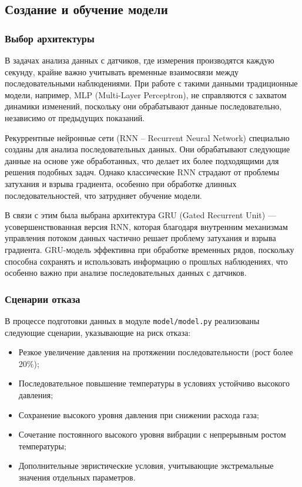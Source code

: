 \documentclass[a4paper,12pt]{article}
\begin{document}
\begin{flushleft}
    \subsection{Создание и обучение модели}

\subsubsection{Выбор архитектуры}

В задачах анализа данных с датчиков, где измерения производятся каждую секунду, крайне важно учитывать временные взаимосвязи между последовательными наблюдениями. При работе с такими данными традиционные модели, например, MLP (Multi-Layer Perceptron), не справляются с захватом динамики изменений, поскольку они обрабатывают данные последовательно, независимо от предыдущих показаний.

Рекуррентные нейронные сети (RNN – Recurrent Neural Network) специально созданы для анализа последовательных данных. Они обрабатывают следующие данные на основе уже обработанных, что делает их более подходящими для решения подобных задач. Однако классические RNN страдают от проблемы затухания и взрыва градиента, особенно при обработке длинных последовательностей, что затрудняет обучение модели.

В связи с этим была выбрана архитектура GRU (Gated Recurrent Unit) --- усовершенствованная версия RNN, которая благодаря внутренним механизмам управления потоком данных частично решает проблему затухания и взрыва градиента. GRU-модель эффективна при обработке временных рядов, поскольку способна сохранять и использовать информацию о прошлых наблюдениях, что особенно важно при анализе последовательных данных с датчиков.

\subsubsection{Сценарии отказа}

В процессе подготовки данных в модуле \texttt{model/model.py} реализованы следующие сценарии, указывающие на риск отказа:
\begin{itemize}
    \item Резкое увеличение давления на протяжении последовательности (рост более 20\%);
    \item Последовательное повышение температуры в условиях устойчиво высокого давления;
    \item Сохранение высокого уровня давления при снижении расхода газа;
    \item Сочетание постоянного высокого уровня вибрации с непрерывным ростом температуры;
    \item Дополнительные эвристические условия, учитывающие экстремальные значения отдельных параметров.
\end{itemize}


\end{flushleft}
\end{document}
